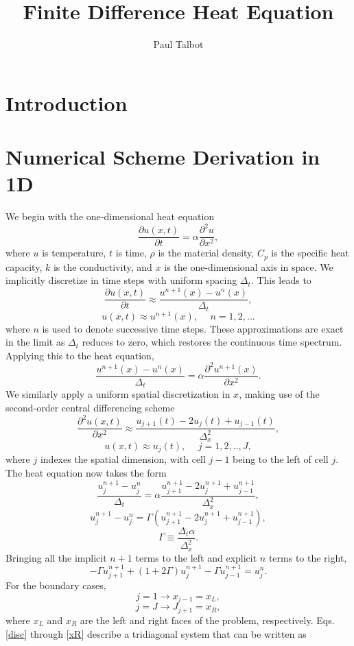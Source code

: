 \documentclass[11pt]{article} %
\title{Finite Difference Heat Equation}
\author{Paul Talbot}
\newcommand{\drv}[2]{\ensuremath{\frac{\partial #1}{\partial #2}}}
\newcommand{\ddrv}[2]{\ensuremath{\frac{\partial^2 #1}{\partial #2^2}}}
\newcommand{\eqn}[1]{\begin{equation} #1 \end{equation}}
\begin{document}
\maketitle

\section{Introduction}

\section{Numerical Scheme Derivation in 1D}
We begin with the one-dimensional heat equation
\eqn{\drv{u(x,t)}{t}=\alpha\ddrv{u}{x},}
where $u$ is temperature, $t$ is time, $\rho$ is the material density, $C_p$ is the specific heat capacity, $k$ is the conductivity, and $x$ is the one-dimensional axis in space.  We implicitly discretize in time steps with uniform spacing $\Delta_t$.  This leads to
\eqn{\drv{u(x,t)}{t}\approx\frac{u^{n+1}(x)-u^n(x)}{\Delta_t},}
\eqn{u(x,t)\approx u^{n+1}(x),\hspace{15pt} n=1,2,...}
where $n$ is used to denote successive time steps.  These approximations are exact in the limit as $\Delta_t$ reduces to zero, which restores the continuous time spectrum.  Applying this to the heat equation,
\eqn{\frac{u^{n+1}(x)-u^n(x)}{\Delta_t}=\alpha\ddrv{u^{n+1}(x)}{x}.}
We similarly apply a uniform spatial discretization in $x$, making use of the second-order central differencing scheme
\eqn{\ddrv{u(x,t)}{x}\approx\frac{u_{j+1}(t)-2u_{j}(t)+u_{j-1}(t)}{\Delta_x^2},}
\eqn{u(x,t)\approx u_j(t),\hspace{15pt} j=1,2,..,J ,}
where $j$ indexes the spatial dimension, with cell $j-1$ being to the left of cell $j$. The heat equation now takes the form
\eqn{\frac{u^{n+1}_j-u^n_j}{\Delta_t}=\alpha\frac{u_{j+1}^{n+1}-2u_{j}^{n+1}+u_{j-1}^{n+1}}{\Delta_x^2},}
\eqn{u^{n+1}_j-u^n_j=\Gamma\left(u_{j+1}^{n+1}-2u_{j}^{n+1}+u_{j-1}^{n+1}\right),}
\eqn{\Gamma\equiv\frac{\Delta_t\alpha}{\Delta_x^2}.}
Bringing all the implicit $n+1$ terms to the left and explicit $n$ terms to the right,
\eqn{-\Gamma u_{j+1}^{n+1}+ (1+2\Gamma)u_j^{n+1} -\Gamma u_{j-1}^{n+1}=u_j^n.\label{disc}}
For the boundary cases,
\eqn{j=1\to x_{j-1}=x_L,\label{xL}}
\eqn{j=J\to J_{j+1}=x_R,\label{xR}}
where $x_L$ and $x_R$ are the left and right faces of the problem, respectively.  Eqs. \eqref{disc} through \eqref{xR} describe a tridiagonal system that can be written as
\end{document}
